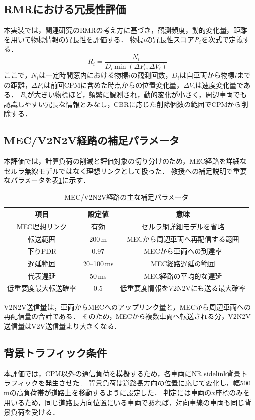 \subsection{RMRにおける冗長性評価}
本実装では，関連研究のRMRの考え方に基づき，観測頻度，動的変化量，距離を用いて物標情報の冗長性を評価する．
物標$i$の冗長性スコア$R_i$を次式で定義する．
\begin{equation}
 R_i =
 \frac{N_i}
 {D_i \min(\Delta P_i, \Delta V_i)}
\end{equation}
ここで，$N_i$は一定時間窓内における物標$i$の観測回数，$D_i$は自車両から物標$i$までの距離，$\Delta P_i$は前回CPMに含めた時点からの位置変化量，$\Delta V_i$は速度変化量である．
$R_i$が大きい物標ほど，頻繁に観測され，動的変化が小さく，周辺車両でも認識しやすい冗長な情報とみなし，CBRに応じた削除個数の範囲でCPMから削除する．

\subsection{MEC/V2N2V経路の補足パラメータ}
本評価では，計算負荷の削減と評価対象の切り分けのため，MEC経路を詳細なセルラ無線モデルではなく理想リンクとして扱った．
教授への補足説明で重要なパラメータを表\ref{tab:mec_params}に示す．

\begin{table}[t]
  \centering
  \caption{MEC/V2N2V経路の主な補足パラメータ}
  \label{tab:mec_params}
  \begin{tabular}{ccc}
    \hline
    項目 & 設定値 & 意味 \\ \hline \hline
    MEC理想リンク & 有効 & セルラ網詳細モデルを省略 \\
    転送範囲 & 200\,m & MECから周辺車両へ再配信する範囲 \\
    下りPDR & 0.97 & MECから車両への到達率 \\
    遅延範囲 & 20--100\,ms & MEC経路遅延の範囲 \\
    代表遅延 & 50\,ms & MEC経路の平均的な遅延 \\
    低重要度最大転送確率 & 0.5 & 低重要度情報をV2N2Vにも送る最大確率 \\ \hline
  \end{tabular}
\end{table}

V2N2V送信量は，車両からMECへのアップリンク量と，MECから周辺車両への再配信量の合計である．
そのため，MECから複数車両へ転送される分，V2N2V送信量はV2V送信量より大きくなる．

\subsection{背景トラフィック条件}
本評価では，CPM以外の通信負荷を模擬するため，各車両にNR sidelink背景トラフィックを発生させた．
背景負荷は道路長方向の位置に応じて変化し，幅500\,mの高負荷帯が道路上を移動するように設定した．
判定には車両の$x$座標のみを用いるため，同じ道路長方向位置にいる車両であれば，対向車線の車両も同じ背景負荷を受ける．

